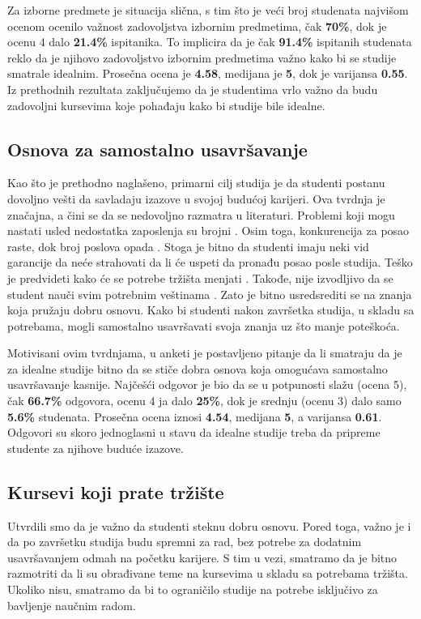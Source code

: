 \documentclass[a4paper]{article}
\begin{document}
{Za izborne predmete je situacija slična, s tim što je veći broj studenata najvišom ocenom ocenilo važnost zadovoljstva izbornim predmetima, čak \textbf{70\%}, dok je ocenu 4 dalo \textbf{21.4\%} ispitanika. To implicira da je čak \textbf{91.4\%} ispitanih studenata reklo da je njihovo zadovoljstvo izbornim predmetima važno kako bi se studije smatrale idealnim. Prosečna ocena je \textbf{4.58}, medijana je \textbf{5}, dok je varijansa \textbf{0.55}. Iz prethodnih rezultata zaključujemo da je studentima vrlo važno da budu zadovoljni kursevima koje pohađaju kako bi studije bile idealne.


\subsection{Osnova za samostalno usavršavanje}
\label{subsec:usavršavanje_stavovi}
Kao što je prethodno naglašeno, primarni cilj studija je da studenti postanu dovoljno vešti da savladaju izazove u svojoj budućoj karijeri. Ova tvrdnja je značajna, a čini se da se nedovoljno razmatra u literaturi. Problemi koji mogu nastati usled nedostatka zaposlenja su brojni \cite{job_lacking}. Osim toga, konkurencija za posao raste, dok broj poslova opada \cite{job_competition}. Stoga je bitno da studenti imaju neki vid garancije da neće strahovati da li će uspeti da pronađu posao posle studija.
Teško je predvideti kako će se potrebe tržišta menjati \cite{job_prediction}. Takođe, nije izvodljivo da se student nauči svim potrebnim veštinama \cite{learn_everything}. Zato je bitno usredsrediti se na znanja koja pružaju dobru osnovu. Kako bi studenti nakon završetka studija, u skladu sa potrebama, mogli samostalno usavršavati svoja znanja uz što manje poteškoća.

Motivisani ovim tvrdnjama, u anketi je postavljeno pitanje da li smatraju da je za idealne studije bitno da se stiče dobra osnova koja omogućava samostalno usavršavanje kasnije. Najčešći odgovor je bio da se u potpunosti slažu (ocena 5), čak \textbf{66.7\%} odgovora, ocenu 4 ja dalo \textbf{25\%}, dok je srednju (ocenu 3) dalo samo \textbf{5.6\%} studenata. Prosečna ocena iznosi \textbf{4.54}, medijana \textbf{5}, a varijansa \textbf{0.61}. Odgovori su skoro jednoglasni u stavu da idealne studije treba da pripreme studente za njihove buduće izazove. 

\subsection{Kursevi koji prate tržište}
\label{subsec:tržište_stavovi}
Utvrdili smo da je važno da studenti steknu dobru osnovu. Pored toga, važno je i da po završetku studija budu spremni za rad, bez potrebe za dodatnim usavršavanjem odmah na početku karijere.
S tim u vezi, smatramo da je bitno razmotriti da li su obrađivane teme na kursevima u skladu sa potrebama tržišta. Ukoliko nisu, smatramo da bi to ograničilo studije na potrebe isključivo za bavljenje naučnim radom.

}
\end{document}
